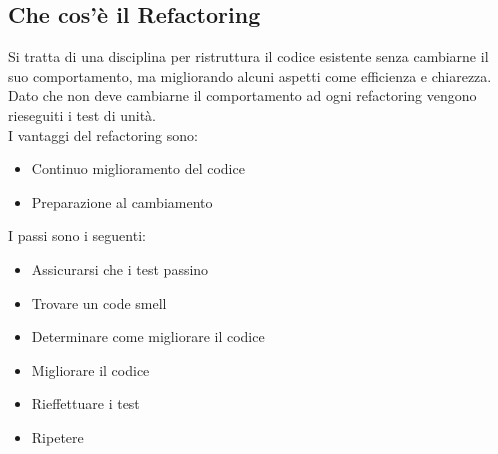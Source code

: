 \documentclass[12pt, a4paper, openany]{book}
\begin{document}
\subsection*{Che cos'è il Refactoring}
Si tratta di una disciplina per ristruttura il codice esistente senza cambiarne il suo comportamento,
ma migliorando alcuni aspetti come efficienza e chiarezza. Dato che non deve
cambiarne il comportamento ad ogni refactoring vengono rieseguiti i test di unità.\\
I vantaggi del refactoring sono:
\begin{itemize}
    \item Continuo miglioramento del codice
    \item Preparazione al cambiamento
\end{itemize}
I passi sono i seguenti:
\begin{itemize}
    \item Assicurarsi che i test passino
    \item Trovare un code smell
    \item Determinare come migliorare il codice
    \item Migliorare il codice
    \item Rieffettuare i test
    \item Ripetere
\end{itemize}
\end{document}
